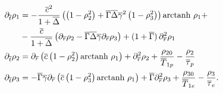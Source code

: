 \documentclass[%
oneside,                 %
final,                   %
10pt]{article}
\begin{document}
\begin{align} 
	\partial_{\overline{t}} \rho_1 
	&=
	-\frac{\overline{c}^2}{1+\overline{\Delta}}
	\left(
		\left(
			1 - \rho_2^2
		\right)
		+
		\overline{\Gamma}\overline{\Delta}\overline{\gamma}^2
		\left(
			1 - \rho_3^2
		\right)
	\right)
	\text{arctanh }\rho_1 + 
	\nonumber\\
	&-\frac{\overline{c}}{1+\overline{\Delta}}
	\left(
		\partial_{\overline{r}} \rho_2 - \overline{\Gamma}\overline{\Delta}\overline{\gamma} \partial_{\overline{r}} \rho_3
	\right)
	+ ( 1 + \overline{\Gamma} )\, \partial_{\overline{r}}^2 \rho_1
	\label{eq:btransport1} \\
	\partial_{\overline{t}} \rho_2 
	&=
	\partial_{\overline{r}}
	\left(
		\overline{c}
		\left( 1 - \rho_2^2 \right)
		\text{arctanh }\rho_1
	\right)
	+ \partial_{\overline{r}}^2 \rho_2
	+ \frac{\rho_{20}}{\overline{T}_{1p}} 
	- \frac{\rho_2}{\overline{\tau}_p}
	\label{eq:btransport2} \\
	\partial_{\overline{t}} \rho_3
	&=
	- 
	\overline{\Gamma}\overline{\gamma}
	\partial_{\overline{r}}
	\left(
		\overline{c}
		\left( 1 - \rho_3^2 \right)
		\text{arctanh }\rho_1
	\right)
	+ \overline{\Gamma} \partial_{\overline{r}}^2 \rho_3
	+ \frac{\rho_{30}}{\overline{T}_{1e}} 
	- \frac{\rho_3}{\overline{\tau}_e} .
	\label{eq:btransport3}
\end{align}








\end{document}
